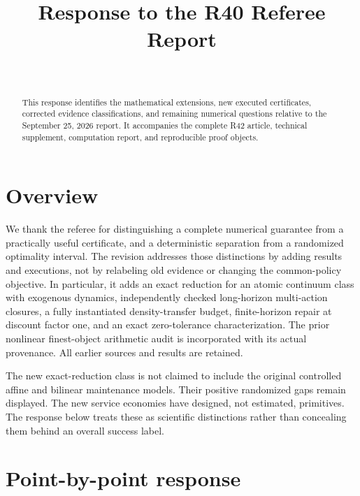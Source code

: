 

\begin{frontmatter}
\title{Response to the R40 Referee Report}
\begin{aug}\author[id=au1,addressref={add1}]{~}\address[id=add1]{}\end{aug}
\begin{abstract}This response identifies the mathematical extensions, new executed certificates, corrected evidence classifications, and remaining numerical questions relative to the September 25, 2026 report. It accompanies the complete R42 article, technical supplement, computation report, and reproducible proof objects.\end{abstract}
\end{frontmatter}
\section{Overview}
We thank the referee for distinguishing a complete numerical guarantee from a practically useful certificate, and a deterministic separation from a randomized optimality interval. The revision addresses those distinctions by adding results and executions, not by relabeling old evidence or changing the common-policy objective. In particular, it adds an exact reduction for an atomic continuum class with exogenous dynamics, independently checked long-horizon multi-action closures, a fully instantiated density-transfer budget, finite-horizon repair at discount factor one, and an exact zero-tolerance characterization. The prior nonlinear finest-object arithmetic audit is incorporated with its actual provenance. All earlier sources and results are retained.

The new exact-reduction class is not claimed to include the original controlled affine and bilinear maintenance models. Their positive randomized gaps remain displayed. The new service economies have designed, not estimated, primitives. The response below treats these as scientific distinctions rather than concealing them behind an overall success label.

\section{Point-by-point response}
